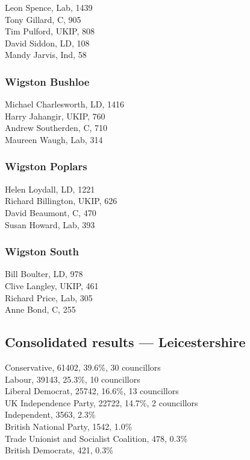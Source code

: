 \documentclass[a4paper,openany,10pt]{book}
\begin{document}


Leon Spence, Lab, 1439\\
Tony Gillard, C, 905\\
Tim Pulford, UKIP, 808\\
David Siddon, LD, 108\\
Mandy Jarvis, Ind, 58\\


\subsubsection*{Wigston Bushloe}



{Michael Charlesworth}, LD, 1416\\
Harry Jahangir, UKIP, 760\\
Andrew Southerden, C, 710\\
Maureen Waugh, Lab, 314\\


\subsubsection*{Wigston Poplars}



Helen Loydall, LD, 1221\\
Richard Billington, UKIP, 626\\
David Beaumont, C, 470\\
Susan Howard, Lab, 393\\


\subsubsection*{Wigston South}



Bill Boulter, LD, 978\\
Clive Langley, UKIP, 461\\
Richard Price, Lab, 305\\
Anne Bond, C, 255\\




\subsection*{Consolidated results --- Leicestershire}
Conservative, 61402, 39.6\%, 30 councillors\\
Labour, 39143, 25.3\%, 10 councillors\\
Liberal Democrat, 25742, 16.6\%, 13 councillors\\
UK Independence Party, 22722, 14.7\%, 2 councillors\\
Independent, 3563, 2.3\% \\
British National Party, 1542, 1.0\% \\
Trade Unionist and Socialist Coalition, 478, 0.3\% \\
British Democrats, 421, 0.3\% \\
\end{document}
